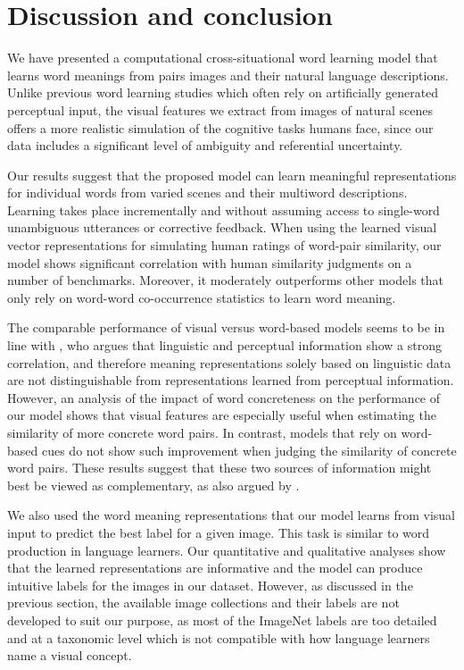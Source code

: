 \section{Discussion and conclusion}
\label{sec:discussion}

We have presented a computational cross-situational word
learning model that learns word meanings from pairs
images and their natural language descriptions. Unlike
previous word learning studies which often rely on artificially
generated perceptual input, the visual features we extract from images
of natural scenes offers a more realistic simulation of the cognitive
tasks humans face, since our data includes a significant level of
ambiguity and referential uncertainty.

Our results suggest that the proposed model can learn meaningful
representations for individual words from varied scenes and their
multiword descriptions. Learning takes place incrementally and without
assuming access to single-word unambiguous utterances or corrective
feedback.  When using the learned visual vector representations for
simulating human ratings of word-pair similarity, our model shows
significant correlation with human similarity judgments on a number of
benchmarks. Moreover, it moderately outperforms other models that only
rely on word-word co-occurrence statistics to learn word meaning.

The comparable performance of visual versus word-based models seems to
be in line with \cite{louwerse2011symbol}, who argues that linguistic
and perceptual information show a strong correlation, and therefore
meaning representations solely based on linguistic data are not
distinguishable from representations learned from perceptual
information. However, an analysis of the impact of word concreteness
on the performance of our model shows that visual features are
especially useful when estimating the similarity of more concrete word
pairs. In contrast, models that rely on word-based cues do not show such improvement
when judging the similarity of concrete word pairs. These results
suggest that these two sources of information might best be viewed as
complementary, as also argued by \cite{bruni2014multimodal}.

We also used the word meaning representations that our model learns
from visual input to predict the best label for a given image. This
task is similar to word production in language learners. Our
quantitative and qualitative analyses show that the learned
representations are informative and the model can produce intuitive
labels for the images in our dataset. However, as discussed in the
previous section, the available image collections and their labels
are not developed to suit our purpose, as most of the ImageNet
labels are too detailed and at a taxonomic level which is not
compatible with how language learners name a visual concept.

